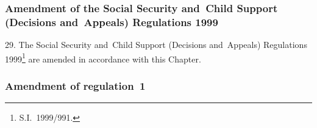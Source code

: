 \documentclass[12pt,a4paper]{article}
\begin{document}
\renewcommand\parthead{--- Part IV Chapter II}

\subsubsection[29. Amendment of the Social Security and~Child Support (Decisions and~Appeals) Regulations 1999]{Amendment of the Social Security and~Child Support (Decisions and~Appeals) Regulations 1999}

29.  The Social Security and~Child Support (Decisions and~Appeals) Regulations 1999\footnote{S.I.~1999/991.} are amended in accordance with this Chapter.

\subsubsection[30. Amendment of regulation~1]{Amendment of regulation~1}
\end{document}
